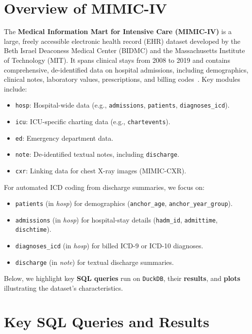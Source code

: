 \documentclass[12pt,a4paper]{report}
\begin{document}
\section{Overview of MIMIC-IV}
The \textbf{Medical Information Mart for Intensive Care (MIMIC-IV)} is a large, freely accessible electronic health record (EHR) dataset developed by the Beth Israel Deaconess Medical Center (BIDMC) and the Massachusetts Institute of Technology (MIT). It spans clinical stays from 2008 to 2019 and contains comprehensive, de-identified data on hospital admissions, including demographics, clinical notes, laboratory values, prescriptions, and billing codes~\cite{johnson2023mimicivscidata,nguyen2023mimicivicd}. Key modules include:
\begin{itemize}
    \item \texttt{hosp}: Hospital-wide data (e.g., \texttt{admissions}, \texttt{patients}, \texttt{diagnoses\_icd}).
    \item \texttt{icu}: ICU-specific charting data (e.g., \texttt{chartevents}).
    \item \texttt{ed}: Emergency department data.
    \item \texttt{note}: De-identified textual notes, including \texttt{discharge}.
    \item \texttt{cxr}: Linking data for chest X-ray images (MIMIC-CXR).
\end{itemize}
For automated ICD coding from discharge summaries, we focus on:
\begin{itemize}
    \item \texttt{patients} (in \textit{hosp}) for demographics (\texttt{anchor\_age}, \texttt{anchor\_year\_group}).
    \item \texttt{admissions} (in \textit{hosp}) for hospital-stay details (\texttt{hadm\_id}, \texttt{admittime}, \texttt{dischtime}).
    \item \texttt{diagnoses\_icd} (in \textit{hosp}) for billed ICD-9 or ICD-10 diagnoses.
    \item \texttt{discharge} (in \textit{note}) for textual discharge summaries.
\end{itemize}

\vspace{0.2cm}
\noindent
Below, we highlight key \textbf{SQL queries} run on \texttt{DuckDB}, their \textbf{results}, and \textbf{plots} illustrating the dataset's characteristics.

\section{Key SQL Queries and Results}
\end{document}
